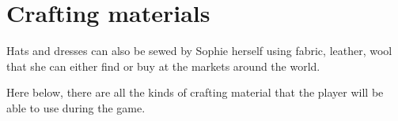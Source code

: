 \section{Crafting materials}
Hats and dresses can also be sewed by Sophie herself using fabric, leather, wool that she can either find or buy at the markets around the world.

Here below, there are all the kinds of crafting material that the player will be able to use during the game.


